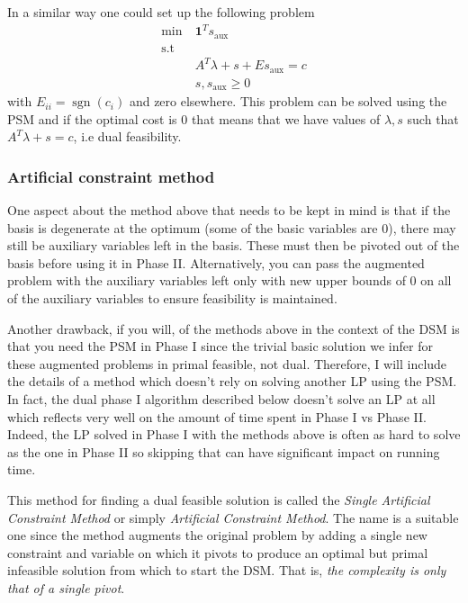 In a similar way one could set up the following problem
\begin{align*}
    \operatorname{min} \> & \mathbf{1}^T s_\text{aux}           \\
    \text{s.t}            &                                     \\
                          & A^T \lambda + s + Es_\text{aux} = c \\
                          & s, s_\text{aux} \geq 0
\end{align*}
with $E_{ii} = \operatorname{sgn}(c_i)$ and zero elsewhere.
This problem can be solved using the PSM and if the optimal cost is 0 that means that we have values of $\lambda, s$ such that $A^T\lambda + s = c$, i.e dual feasibility.

\subsubsection{Artificial constraint method}
One aspect about the method above that needs to be kept in mind is that if the basis is degenerate at the optimum (some of the basic variables are 0), there may still be auxiliary variables left in the basis.
These must then be pivoted out of the basis before using it in Phase II.
Alternatively, you can pass the augmented problem with the auxiliary variables left only with new upper bounds of 0 on all of the auxiliary variables to ensure feasibility is maintained.

Another drawback, if you will, of the methods above in the context of the DSM is that you need the PSM in Phase I since the trivial basic solution we infer for these augmented problems in primal feasible, not dual.
Therefore, I will include the details of a method which doesn't rely on solving another LP using the PSM.
In fact, the dual phase I algorithm described below doesn't solve an LP at all which reflects very well on the amount of time spent in Phase I vs Phase II.
Indeed, the LP solved in Phase I with the methods above is often as hard to solve as the one in Phase II so skipping that can have significant impact on running time.

This method for finding a dual feasible solution is called the \textit{Single Artificial Constraint Method} or simply \textit{Artificial Constraint Method}.
The name is a suitable one since the method augments the original problem by adding a single new constraint and variable on which it pivots to produce an optimal but primal infeasible solution from which to start the DSM.
That is, \textit{the complexity is only that of a single pivot}.

